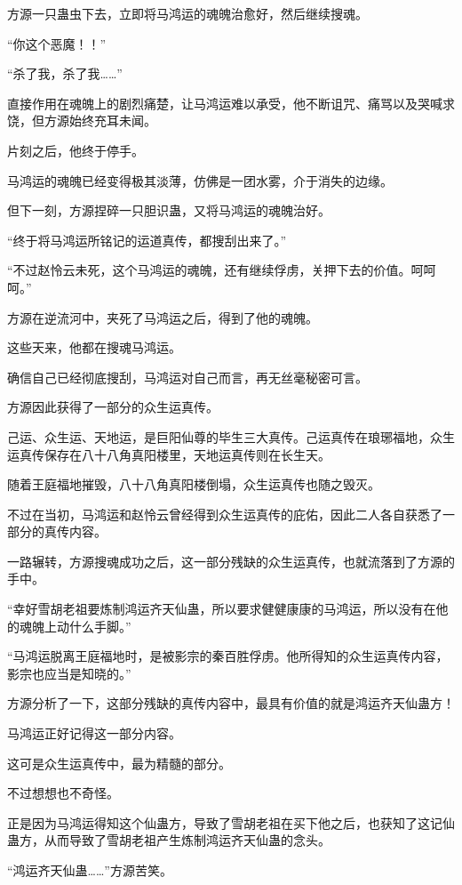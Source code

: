 \begin{this_body}
方源一只蛊虫下去，立即将马鸿运的魂魄治愈好，然后继续搜魂。

“你这个恶魔！！”

“杀了我，杀了我……”

直接作用在魂魄上的剧烈痛楚，让马鸿运难以承受，他不断诅咒、痛骂以及哭喊求饶，但方源始终充耳未闻。

片刻之后，他终于停手。

马鸿运的魂魄已经变得极其淡薄，仿佛是一团水雾，介于消失的边缘。

但下一刻，方源捏碎一只胆识蛊，又将马鸿运的魂魄治好。

“终于将马鸿运所铭记的运道真传，都搜刮出来了。”

“不过赵怜云未死，这个马鸿运的魂魄，还有继续俘虏，关押下去的价值。呵呵呵。”

方源在逆流河中，夹死了马鸿运之后，得到了他的魂魄。

这些天来，他都在搜魂马鸿运。

确信自己已经彻底搜刮，马鸿运对自己而言，再无丝毫秘密可言。

方源因此获得了一部分的众生运真传。

己运、众生运、天地运，是巨阳仙尊的毕生三大真传。己运真传在琅琊福地，众生运真传保存在八十八角真阳楼里，天地运真传则在长生天。

随着王庭福地摧毁，八十八角真阳楼倒塌，众生运真传也随之毁灭。

不过在当初，马鸿运和赵怜云曾经得到众生运真传的庇佑，因此二人各自获悉了一部分的真传内容。

一路辗转，方源搜魂成功之后，这一部分残缺的众生运真传，也就流落到了方源的手中。

“幸好雪胡老祖要炼制鸿运齐天仙蛊，所以要求健健康康的马鸿运，所以没有在他的魂魄上动什么手脚。”

“马鸿运脱离王庭福地时，是被影宗的秦百胜俘虏。他所得知的众生运真传内容，影宗也应当是知晓的。”

方源分析了一下，这部分残缺的真传内容中，最具有价值的就是鸿运齐天仙蛊方！

马鸿运正好记得这一部分内容。

这可是众生运真传中，最为精髓的部分。

不过想想也不奇怪。

正是因为马鸿运得知这个仙蛊方，导致了雪胡老祖在买下他之后，也获知了这记仙蛊方，从而导致了雪胡老祖产生炼制鸿运齐天仙蛊的念头。

“鸿运齐天仙蛊……”方源苦笑。


\end{this_body}
